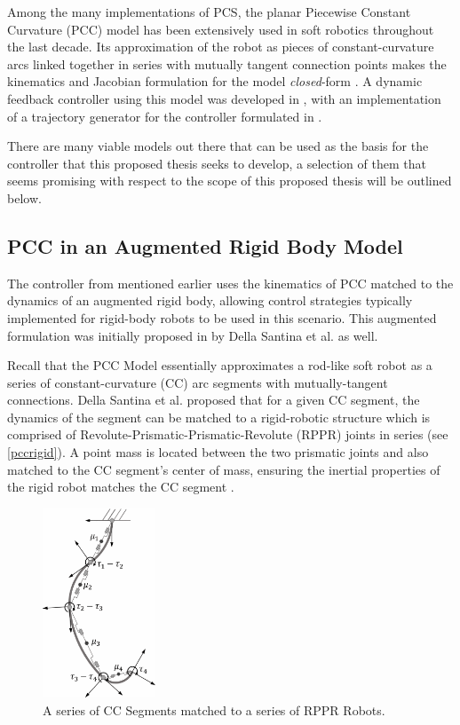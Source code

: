 Among the many implementations of PCS, the planar Piecewise Constant Curvature (PCC) model has been extensively used in soft robotics throughout the last decade. Its approximation of the robot as pieces of constant-curvature arcs linked together in series with mutually tangent connection points makes the kinematics and Jacobian formulation for the model \textit{closed}-form \cite{websteriii_design_2010}. A dynamic feedback controller using this model was developed in \cite{della_santina_model-based_2020}, with an implementation of a trajectory generator for the controller formulated in \cite{dickson_real-time_2025}. 

There are many viable models out there that can be used as the basis for the controller that this proposed thesis seeks to develop, a selection of them that seems promising with respect to the scope of this proposed thesis will be outlined below.
\subsection{PCC in an Augmented Rigid Body Model}
The controller from \cite{della_santina_model-based_2020} mentioned earlier uses the kinematics of PCC matched to the dynamics of an augmented rigid body, allowing control strategies typically implemented for rigid-body robots to be used in this scenario. This augmented formulation was initially proposed in \cite{della_santina_dynamic_2018} by Della Santina et al. as well. 

Recall that the PCC Model essentially approximates a rod-like soft robot as a series of constant-curvature (CC) arc segments with mutually-tangent connections. Della Santina et al. proposed that for a given CC segment, the dynamics of the segment can be matched to a rigid-robotic structure which is comprised of Revolute-Prismatic-Prismatic-Revolute (RPPR) joints in series (see \autoref{pccrigid}). A point mass is located between the two prismatic joints and also matched to the CC segment's center of mass, ensuring the inertial properties of the rigid robot matches the CC segment \cite{della_santina_dynamic_2018}.

\begin{figure}[h!]
    \centering
    \includegraphics[width=0.3\textwidth]{graphics/pccrigid.png}
    \caption{A series of CC Segments matched to a series of RPPR Robots. }
    \label{pccrigid}
\end{figure}

